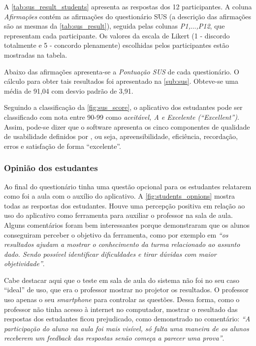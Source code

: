 A \autoref{tab:sus_result_students} apresenta as respostas dos 12 participantes.
A coluna \textit{Afirmações} contém as afirmações do questionário SUS (a descrição das afirmações são as mesmas da \autoref{tab:sus_result}),
seguida pelas colunas \textit{P1,$\ldots$,P12}, que representam cada participante.
Os valores da escala de Likert
(1 - discordo totalmente e 5 - concordo plenamente) escolhidas pelos participantes estão mostradas
na tabela.

Abaixo das afirmações apresenta-se a \textit{Pontuação SUS} de cada questionário. O cálculo
para obter tais resultados foi apresentado na \autoref{sub:sus}. Obteve-se uma média de
91,04 com desvio padrão de 3,91.

Seguindo a classificação da \autoref{fig:sus_score}, o aplicativo dos estudantes pode ser classificado com nota entre 90-99 como \textit{aceitável, A e Excelente (``Excellent'')}.
Assim, pode-se dizer que o software apresenta os cinco componentes de qualidade de usabilidade definidos
por , ou seja, apreensibilidade, eficiência, recordação, erros e satisfação
de forma ``excelente''.

\subsubsection{Opinião dos estudantes}
Ao final do questionário tinha uma questão opcional para os estudantes relatarem como foi a aula
com o auxílio do aplicativo. A \autoref{fig:students_opnions} mostra todas as respostas dos estudantes.
Houve uma percepção positiva em relação ao uso do aplicativo como ferramenta para auxiliar o professor
na sala de aula. Alguns comentários foram bem interessantes porque demonstraram que os alunos
conseguiram perceber o objetivo da ferramenta, como por exemplo em \textit{``os resultados ajudam a mostrar o conhecimento
da turma relacionado ao assunto dado. Sendo possível identificar dificuldades e tirar dúvidas com maior objetividade''}.

Cabe destacar aqui que o teste em sala de aula do sistema não foi no seu caso ``ideal'' de uso, que era o professor
mostrar no projetor os resultados. O professor uso apenas o seu \textit{smartphone} para controlar as questões.
Dessa forma, como o professor não tinha acesso à internet no computador, mostrar o resultado das respostas
dos estudantes ficou prejudicado, como demonstrado no comentário:
\textit{``A participação do aluno na aula foi mais visível, só falta uma maneira de os alunos receberem um feedback das respostas senão começa a parecer uma prova''}.


